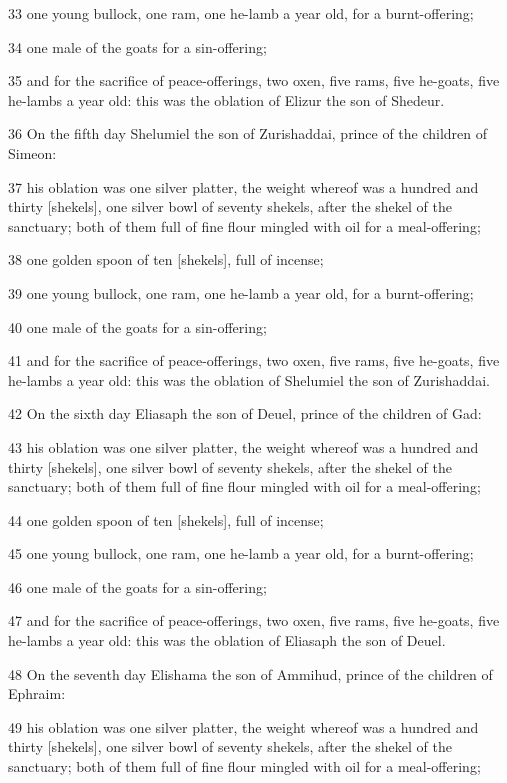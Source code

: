 \par 33 one young bullock, one ram, one he-lamb a year old, for a burnt-offering;
\par 34 one male of the goats for a sin-offering;
\par 35 and for the sacrifice of peace-offerings, two oxen, five rams, five he-goats, five he-lambs a year old: this was the oblation of Elizur the son of Shedeur.
\par 36 On the fifth day Shelumiel the son of Zurishaddai, prince of the children of Simeon:
\par 37 his oblation was one silver platter, the weight whereof was a hundred and thirty [shekels], one silver bowl of seventy shekels, after the shekel of the sanctuary; both of them full of fine flour mingled with oil for a meal-offering;
\par 38 one golden spoon of ten [shekels], full of incense;
\par 39 one young bullock, one ram, one he-lamb a year old, for a burnt-offering;
\par 40 one male of the goats for a sin-offering;
\par 41 and for the sacrifice of peace-offerings, two oxen, five rams, five he-goats, five he-lambs a year old: this was the oblation of Shelumiel the son of Zurishaddai.
\par 42 On the sixth day Eliasaph the son of Deuel, prince of the children of Gad:
\par 43 his oblation was one silver platter, the weight whereof was a hundred and thirty [shekels], one silver bowl of seventy shekels, after the shekel of the sanctuary; both of them full of fine flour mingled with oil for a meal-offering;
\par 44 one golden spoon of ten [shekels], full of incense;
\par 45 one young bullock, one ram, one he-lamb a year old, for a burnt-offering;
\par 46 one male of the goats for a sin-offering;
\par 47 and for the sacrifice of peace-offerings, two oxen, five rams, five he-goats, five he-lambs a year old: this was the oblation of Eliasaph the son of Deuel.
\par 48 On the seventh day Elishama the son of Ammihud, prince of the children of Ephraim:
\par 49 his oblation was one silver platter, the weight whereof was a hundred and thirty [shekels], one silver bowl of seventy shekels, after the shekel of the sanctuary; both of them full of fine flour mingled with oil for a meal-offering;

